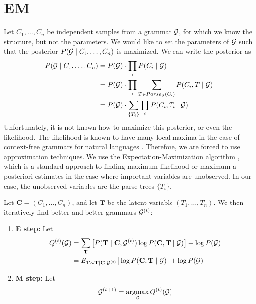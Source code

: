 
\section{EM}


Let $C_1,\dots, C_n$ be independent samples from a grammar ${\mathcal G}$, for
which we know the structure, but not the parameters. We would like to
set the parameters of ${\mathcal G}$ such that the posterior $P({\mathcal G}\mid
C_1,\dots,C_n)$ is maximized. We can write the posterior as
\begin{align*}
  P({\mathcal G}\mid C_1,\dots, C_n) &= P({\mathcal G}) \cdot \prod_i P(C_i\mid {\mathcal G})\\
  &= P({\mathcal G}) \cdot \prod_i \sum_{T\in Parse_{{\mathcal G}}(C_i)}P(C_i, T \mid {\mathcal G})\\
  &= P({\mathcal G}) \cdot \sum_{\{T_i\}}\prod_i P(C_i, T_i \mid {\mathcal G})\\
\end{align*}
Unfortunately, it is not known how to maximize this posterior, or even
the likelihood. The likelihood is known to have many local maxima in
the case of context-free grammars for natural languages
\cite{charniak}. Therefore, we are forced to use approximation
techniques. We use the Expectation-Maximization algorithm \cite{em},
which is a standard approach to finding maximum likelihood or maximum
a posteriori estimates in the case where important variables are
unobserved. In our case, the unobserved variables are the parse trees
$\{T_i\}$.

Let $\mathbf{C} = (C_1,\dots,C_n)$, and let $\mathbf{T}$ be the latent
variable $(T_1,\dots,T_n)$. We then iteratively find better and better
grammars ${\mathcal G}^{(t)}$:
\begin{enumerate}
\item \textbf{E step:} Let 
  \begin{align*}
Q^{(t)}({\mathcal G}) &= \sum_{\mathbf{T}} \big[P(\mathbf{T}\mid \mathbf{C},
{\mathcal G}^{(t)}) \log P(\mathbf{C},\mathbf{T}\mid {\mathcal G}) \big] + \log
P({\mathcal G})\\
&= E_{\mathbf{T} \sim \mathbf{T} | \mathbf{C}, {\mathcal G}^{(t)}}\big[\log
P(\mathbf{C},\mathbf{T}\mid {\mathcal G}) \big] + \log P({\mathcal G})
  \end{align*}
\item \textbf{M step:} Let
$$ {\mathcal G}^{(t+1)} = \operatorname*{argmax}_{{\mathcal G}} Q^{(t)}({\mathcal G})$$
\end{enumerate}

